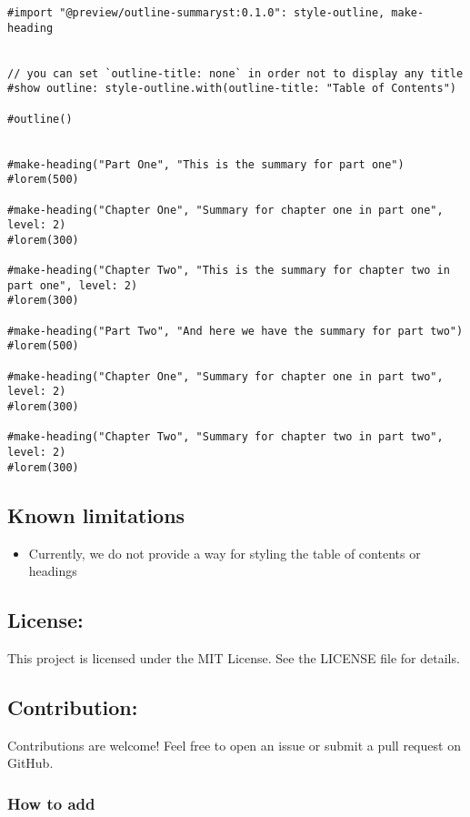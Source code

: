 \begin{verbatim}
#import "@preview/outline-summaryst:0.1.0": style-outline, make-heading


// you can set `outline-title: none` in order not to display any title
#show outline: style-outline.with(outline-title: "Table of Contents")

#outline()


#make-heading("Part One", "This is the summary for part one")
#lorem(500)

#make-heading("Chapter One", "Summary for chapter one in part one", level: 2)
#lorem(300)

#make-heading("Chapter Two", "This is the summary for chapter two in part one", level: 2)
#lorem(300)

#make-heading("Part Two", "And here we have the summary for part two")
#lorem(500)

#make-heading("Chapter One", "Summary for chapter one in part two", level: 2)
#lorem(300)

#make-heading("Chapter Two", "Summary for chapter two in part two", level: 2)
#lorem(300)
\end{verbatim}

\subsection{Known limitations}\label{known-limitations}

\begin{itemize}
\tightlist
\item
  Currently, we do not provide a way for styling the table of contents
  or headings
\end{itemize}

\subsection{License:}\label{license}

This project is licensed under the MIT License. See the LICENSE file for
details.

\subsection{Contribution:}\label{contribution}

Contributions are welcome! Feel free to open an issue or submit a pull
request on GitHub.

\subsubsection{How to add}\label{how-to-add}

